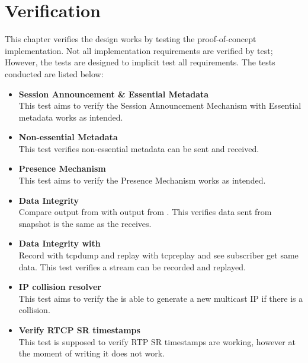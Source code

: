 \chapter{Verification} \label{sec:design:verification}
This chapter verifies the design works by testing the proof-of-concept implementation. Not all implementation requirements are verified by test; However, the tests are designed to implicit test all requirements.
The tests conducted are listed below:
\begin{itemize}
	\item \textbf{Session Announcement \& Essential Metadata}\\
This test aims to verify the Session Announcement Mechanism with Essential metadata works as intended.

	\item \textbf{Non-essential Metadata}\\
This test verifies non-essential metadata can be sent and received.


	\item \textbf{Presence Mechanism}\\
This test aims to verify the Presence Mechanism works as intended.


		\item \textbf{Data Integrity}\\
	Compare output from \con{} with output from .
This verifies data sent from snapshot is the same as the \con{} receives.



\item \textbf{Data Integrity with \hist{}}\\
Record with tcpdump and replay with tcpreplay and see subscriber get same data.
This test verifies a stream can be recorded and replayed.

	\item \textbf{IP collision resolver}\\
This test aims to verify the \pub{} is able to generate a new multicast IP if there is a collision.

	
	\item \textbf{Verify RTCP SR timestamps}\\
This test is supposed to verify RTP SR timestamps are working, however at the moment of writing it does not work.
\end{itemize}

